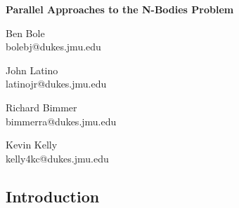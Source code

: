 \documentclass[11pt]{article}
\begin{document}

\begin{center}
\bfseries\huge
Parallel Approaches to the N-Bodies Problem
\end{center}

\begin{multicols}{4}
\centering

Ben Bole \\
{\footnotesize bolebj@dukes.jmu.edu}

John Latino \\
{\footnotesize latinojr@dukes.jmu.edu}

Richard Bimmer \\
{\footnotesize bimmerra@dukes.jmu.edu}

Kevin Kelly \\
{\footnotesize kelly4kc@dukes.jmu.edu}

\end{multicols}

\begin{center}
\section*{Introduction}
\end{center}

\end{document}
